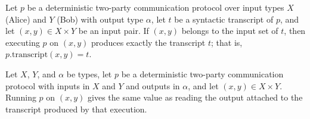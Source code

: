 \begin{theorem}
\label{CommunicationComplexity.Deterministic.Protocol.transcript_eq_of_mem}
\leanok
{}
Let $p$ be a deterministic two-party communication protocol over input types $X$ (Alice)
and $Y$ (Bob) with output type $\alpha$, let $t$ be a syntactic transcript of $p$, and
let $(x, y) \in X \times Y$ be an input pair. If $(x, y)$ belongs to the input set of
$t$, then executing $p$ on $(x, y)$ produces exactly the transcript $t$; that is,
$p.\mathrm{transcript}(x, y) = t$.
\end{theorem}

\begin{theorem}
\label{CommunicationComplexity.Deterministic.Protocol.run_eq_transcript_output}
\leanok
{}
Let $X$, $Y$, and $\alpha$ be types, let $p$ be a deterministic two-party communication
protocol with inputs in $X$ and $Y$ and outputs in $\alpha$, and let $(x,y)\in X\times
Y$. Running $p$ on $(x,y)$ gives the same value as reading the output attached to the
transcript produced by that execution.
\end{theorem}

